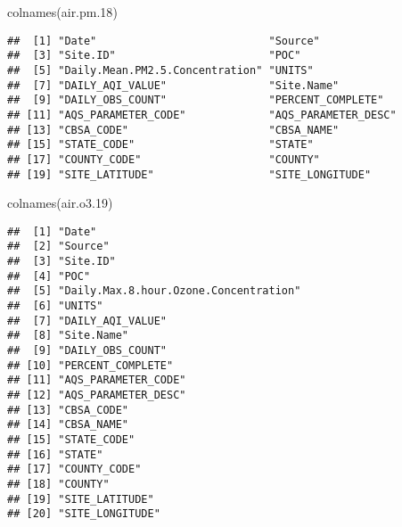 \documentclass[
]{article}
\newenvironment{Shaded}{\begin{snugshade}}{\end{snugshade}}
\newcommand{\FloatTok}[1]{\textcolor[rgb]{0.00,0.00,0.81}{#1}}
\newcommand{\FunctionTok}[1]{\textcolor[rgb]{0.00,0.00,0.00}{#1}}
\newcommand{\NormalTok}[1]{#1}
\begin{document}
\begin{Shaded}
\begin{Highlighting}[]
\FunctionTok{colnames}\NormalTok{(air.pm}\FloatTok{.18}\NormalTok{)}
\end{Highlighting}
\end{Shaded}

\begin{verbatim}
##  [1] "Date"                           "Source"                        
##  [3] "Site.ID"                        "POC"                           
##  [5] "Daily.Mean.PM2.5.Concentration" "UNITS"                         
##  [7] "DAILY_AQI_VALUE"                "Site.Name"                     
##  [9] "DAILY_OBS_COUNT"                "PERCENT_COMPLETE"              
## [11] "AQS_PARAMETER_CODE"             "AQS_PARAMETER_DESC"            
## [13] "CBSA_CODE"                      "CBSA_NAME"                     
## [15] "STATE_CODE"                     "STATE"                         
## [17] "COUNTY_CODE"                    "COUNTY"                        
## [19] "SITE_LATITUDE"                  "SITE_LONGITUDE"
\end{verbatim}

\begin{Shaded}
\begin{Highlighting}[]
\FunctionTok{colnames}\NormalTok{(air.o3}\FloatTok{.19}\NormalTok{)}
\end{Highlighting}
\end{Shaded}

\begin{verbatim}
##  [1] "Date"                                
##  [2] "Source"                              
##  [3] "Site.ID"                             
##  [4] "POC"                                 
##  [5] "Daily.Max.8.hour.Ozone.Concentration"
##  [6] "UNITS"                               
##  [7] "DAILY_AQI_VALUE"                     
##  [8] "Site.Name"                           
##  [9] "DAILY_OBS_COUNT"                     
## [10] "PERCENT_COMPLETE"                    
## [11] "AQS_PARAMETER_CODE"                  
## [12] "AQS_PARAMETER_DESC"                  
## [13] "CBSA_CODE"                           
## [14] "CBSA_NAME"                           
## [15] "STATE_CODE"                          
## [16] "STATE"                               
## [17] "COUNTY_CODE"                         
## [18] "COUNTY"                              
## [19] "SITE_LATITUDE"                       
## [20] "SITE_LONGITUDE"
\end{verbatim}
\end{document}
